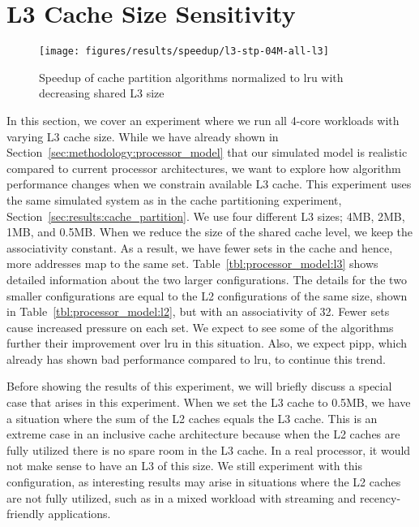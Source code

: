 \section{L3 Cache Size Sensitivity}
\label{sec:results:l3size_sensitivity}


\begin{figure}[th]
    \centering
    \texttt{[image: figures/results/speedup/l3-stp-04M-all-l3]}
    \caption[Speedup with decreasing L3 size]{Speedup of cache partition algorithms normalized to \gls{lru} with decreasing shared L3 size}
    \label{fig:results:l3}
\end{figure}

In this section, we cover an experiment where we run all 4-core workloads with varying L3 cache size.
While we have already shown in Section~\ref{sec:methodology:processor_model} that our simulated model is realistic compared to current processor architectures, we want to explore how algorithm performance changes when we constrain available L3 cache.
This experiment uses the same simulated system as in the cache partitioning experiment, Section~\ref{sec:results:cache_partition}.
We use four different L3 sizes; 4MB, 2MB, 1MB, and 0.5MB.
When we reduce the size of the shared cache level, we keep the associativity constant.
As a result, we have fewer sets in the cache and hence, more addresses map to the same set.
Table~\ref{tbl:processor_model:l3} shows detailed information about the two larger configurations.
The details for the two smaller configurations are equal to the L2 configurations of the same size, shown in Table~\ref{tbl:processor_model:l2}, but with an associativity of 32.
Fewer sets cause increased pressure on each set.
We expect to see some of the algorithms further their improvement over \gls{lru} in this situation.
Also, we expect \gls{pipp}, which already has shown bad performance compared to \gls{lru}, to continue this trend.

Before showing the results of this experiment, we will briefly discuss a special case that arises in this experiment.
When we set the L3 cache to 0.5MB, we have a situation where the sum of the L2 caches equals the L3 cache.
This is an extreme case in an inclusive cache architecture because when the L2 caches are fully utilized there is no spare room in the L3 cache.
In a real processor, it would not make sense to have an L3 of this size.
We still experiment with this configuration, as interesting results may arise in situations where the L2 caches are not fully utilized, such as in a mixed workload with streaming and recency-friendly applications.

